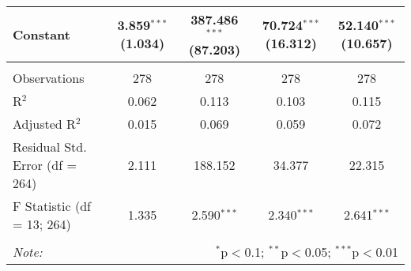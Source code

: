 \begin{table}[H]
\begin{tabular}{@{\extracolsep{5pt}}lcccc}
  Constant & 3.859$^{***}$ (1.034) & 387.486$^{***}$ (87.203) & 70.724$^{***}$ (16.312) & 52.140$^{***}$ (10.657) \\ 
 \hline \\[-1.8ex] 
Observations & 278 & 278 & 278 & 278 \\ 
R$^{2}$ & 0.062 & 0.113 & 0.103 & 0.115 \\ 
Adjusted R$^{2}$ & 0.015 & 0.069 & 0.059 & 0.072 \\ 
Residual Std. Error (df = 264) & 2.111 & 188.152 & 34.377 & 22.315 \\ 
F Statistic (df = 13; 264) & 1.335 & 2.590$^{***}$ & 2.340$^{***}$ & 2.641$^{***}$ \\ 
\hline 
\hline \\[-1.8ex] 
\textit{Note:}  & \multicolumn{4}{r}{$^{*}$p$<$0.1; $^{**}$p$<$0.05; $^{***}$p$<$0.01} \\ 
\end{tabular} 
\end{table} 
